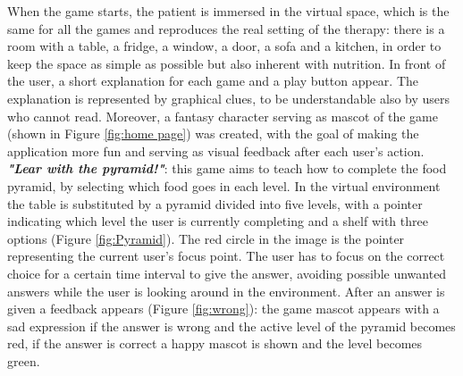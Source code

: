 \documentclass{sigchi-ext}
\begin{document}
When the game starts, the patient is immersed in the virtual space, which is the same for all the games and reproduces the real setting of the therapy: there is a room with a table, a fridge, a window, a door, a sofa and a kitchen, in order to keep the space as simple as possible but also inherent with nutrition. In front of the user, a short explanation for each game and a play button appear. The explanation is represented by graphical clues, to be understandable also by users who cannot read.
Moreover, a fantasy character serving as mascot of the game (shown in Figure \ref{fig:home page}) was created, with the goal of making the application more fun and serving as visual feedback after each user’s action.\\ 
\medskip
\textit{\textbf{"Lear with the pyramid!"}}: this game aims to teach how to complete the food pyramid, by selecting which food goes in each level. In the virtual environment the table is substituted by a pyramid divided into five levels, with a pointer indicating which level the user is currently completing and a shelf with three options (Figure \ref{fig:Pyramid}). The red circle in the image is the pointer representing the current user’s focus point. The user has to focus on the correct choice for a certain time interval to give the answer, avoiding possible unwanted answers while the user is looking around in the environment. After an answer is given a feedback appears (Figure \ref{fig:wrong}): the game mascot appears with a sad expression if the answer is wrong and the active level of the pyramid becomes red, if the answer is correct a happy mascot is shown and the level becomes green.\\
\medskip
\end{document}
